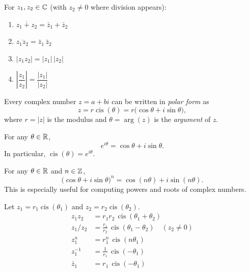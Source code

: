 \begin{propbox}
For $z_1,z_2\in\mathbb{C}$ (with $z_2\neq 0$ where division appears):
\begin{enumerate}
    \item $\overline{z_1+z_2} = \bar{z}_1 + \bar{z}_2$
    \item $\overline{z_1 z_2} = \bar{z}_1\,\bar{z}_2$
    \item $|z_1 z_2| = |z_1|\,|z_2|$
    \item $\left|\dfrac{z_1}{z_2}\right| = \dfrac{|z_1|}{|z_2|}$
\end{enumerate}
\end{propbox}

\begin{defbox}
Every complex number $z = a+bi$ can be written in \emph{polar form} as
\[
    z = r\operatorname{cis}(\theta) = r\bigl(\cos\theta + i\sin\theta\bigr),
\]
where $r = |z|$ is the modulus and $\theta = \arg(z)$ is the \emph{argument}
of $z$.
\end{defbox}

\begin{thmbox}
For any $\theta\in\mathbb{R}$,
\[
    e^{i\theta} = \cos\theta + i\sin\theta.
\]
In particular, $\operatorname{cis}(\theta) = e^{i\theta}$.
\end{thmbox}

\begin{thmbox}
For any $\theta\in\mathbb{R}$ and $n\in\mathbb{Z}$,
\[
    \bigl(\cos\theta + i\sin\theta\bigr)^n = \cos(n\theta) + i\sin(n\theta).
\]
This is especially useful for computing powers and roots of complex numbers.
\end{thmbox}

\begin{flowbox}
Let $z_1 = r_1\operatorname{cis}(\theta_1)$ and
$z_2 = r_2\operatorname{cis}(\theta_2)$.
\begin{align*}
    z_1 z_2     &= r_1 r_2\,\operatorname{cis}(\theta_1+\theta_2) \\
    z_1/z_2     &= \tfrac{r_1}{r_2}\,\operatorname{cis}(\theta_1-\theta_2)
                   \quad(z_2\neq 0)\\
    z_1^n       &= r_1^n\,\operatorname{cis}(n\theta_1) \\
    z_1^{-1}    &= \tfrac{1}{r_1}\,\operatorname{cis}(-\theta_1) \\
    \bar{z}_1   &= r_1\,\operatorname{cis}(-\theta_1)
\end{align*}
\end{flowbox}
